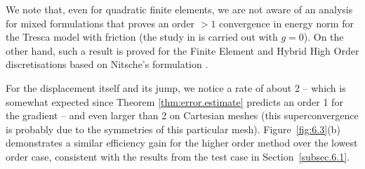 \documentclass[a4paper,11pt]{article}
\theoremstyle{definition}
\theoremstyle{remark}
\begin{document}
  We note that, even for quadratic finite elements, we are not aware of an analysis for mixed formulations that proves an order $>1$ convergence in energy norm for the Tresca model with friction (the study in \cite{wohlmuthquadraticcontact} is carried out with $g=0$). On the other hand, such a result is proved for the Finite Element and Hybrid High Order discretisations based on Nitsche's formulation \cite{Chouly2014,Chouly2020}.

  For the displacement itself and its jump, we notice a rate of about 2 -- which is somewhat expected since Theorem \ref{thm:error.estimate} predicts an order 1 for the gradient -- and even larger than 2 on Cartesian meshes (this superconvergence is probably due to the symmetries of this particular mesh). Figure~\ref{fig:6.3}(b) demonstrates a similar efficiency gain for the higher order method over the lowest order case, consistent with the results from the test case in Section~\ref{subsec.6.1}.
\end{document}
